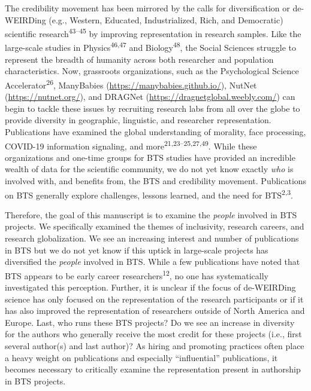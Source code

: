 \documentclass[
  man,floatsintext]{apa6}
\begin{document}
The credibility movement has been mirrored by the calls for
diversification or de-WEIRDing (e.g., Western, Educated, Industrialized,
Rich, and Democratic) scientific research\textsuperscript{43--45} by improving representation in research samples. Like the
large-scale studies in Physics\textsuperscript{46,47} and
Biology\textsuperscript{48}, the Social Sciences struggle to represent the
breadth of humanity across both researcher and population
characteristics. Now, grassroots organizations, such as the
Psychological Science Accelerator\textsuperscript{26}, ManyBabies
(\url{https://manybabies.github.io/}), NutNet (\url{https://nutnet.org/}), and
DRAGNet (\url{https://dragnetglobal.weebly.com/}) can begin to tackle these
issues by recruiting research labs from all over the globe to provide
diversity in geographic, linguistic, and researcher representation.
Publications have examined the global understanding of morality, face
processing, COVID-19 information signaling, and more\textsuperscript{21,23--25,27,49}. While these organizations and one-time groups
for BTS studies have provided an incredible wealth of data for the
scientific community, we do not yet know exactly \emph{who} is involved with,
and benefits from, the BTS and credibility movement. Publications on BTS
generally explore challenges, lessons learned, and the need for BTS\textsuperscript{2,3}.

Therefore, the goal of this manuscript is to examine the \emph{people}
involved in BTS projects. We specifically examined the themes of
inclusivity, research careers, and research globalization. We see an
increasing interest and number of publications in BTS but we do not yet
know if this uptick in large-scale projects has diversified the \emph{people}
involved in BTS. While a few publications have noted that BTS appears to
be early career researchers\textsuperscript{12}, no one has systematically
investigated this perception. Further, it is unclear if the focus of
de-WEIRDing science has only focused on the representation of the
research participants or if it has also improved the representation of
researchers outside of North America and Europe. Last, who runs these
BTS projects? Do we see an increase in diversity for the authors who
generally receive the most credit for these projects (i.e., first
several author(s) and last author)? As hiring and promoting practices
often place a heavy weight on publications and especially ``influential''
publications, it becomes necessary to critically examine the
representation present in authorship in BTS projects.
\end{document}
